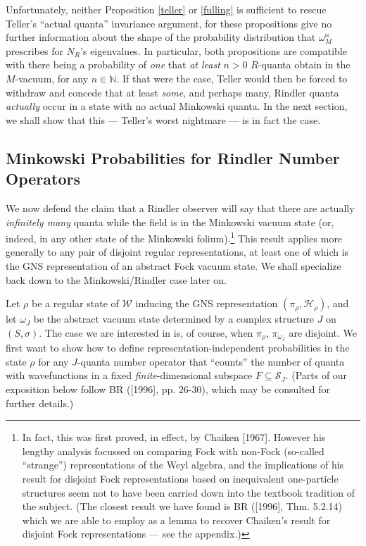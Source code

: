 \documentclass[12pt]{article}
\theoremstyle{remark}
\theoremstyle{definition}
\newcommand{\alg}[1]{\mathcal{#1}}
\newcommand{\hil}[1]{\mathcal{#1}}
\begin{document}
 Unfortunately, neither Proposition \ref{teller} or \ref{fulling} is sufficient to rescue 
 Teller's ``actual quanta'' invariance argument, for these propositions give 
 no further information about the shape of the probability distribution 
 that $\omega_{M}^{\bowtie}$ prescribes for $N_{R}$'s eigenvalues.  
 In particular, both propositions 
 are compatible with there being a probability of \emph{one} that 
 \emph{at least} $n>0$ 
 $R$-quanta obtain in the $M$-vacuum, for any $n\in\mathbb{N}$.  If that 
 were the case, Teller 
 would then be forced to withdraw and concede that at least \emph{some}, and 
 perhaps many, Rindler quanta \emph{actually} occur in a state with no 
 actual Minkowski quanta.  In the next section, we shall show that 
 this ---
 Teller's worst nightmare --- is in fact the case.  

\subsection{Minkowski Probabilities for Rindler Number Operators}

We now defend the claim that a Rindler observer will say that there
are actually \emph{infinitely many} quanta while the field is in the
Minkowski vacuum state (or, indeed, in any other state of the
Minkowski folium).\footnote{In fact, this was first proved, in effect,
  by Chaiken [1967].  However his lengthy analysis focussed on
  comparing Fock with non-Fock (so-called ``strange'') representations
  of the Weyl algebra, and the implications of his result for disjoint
  Fock representations based on inequivalent one-particle structures
  seem not to have been carried down into the textbook tradition of
  the subject.  (The closest result we have found is BR ([1996], Thm.
  5.2.14) which we are able to employ as a lemma to recover Chaiken's
  result for disjoint Fock representations --- see the appendix.)}
This result applies more generally to any pair of disjoint regular
representations, at least one of which is the GNS representation of an
abstract Fock vacuum state. We shall specialize back down to the
Minkowski/Rindler case later on.
  
Let $\rho$ be a regular state of $\alg{W}$ inducing the GNS 
representation $(\pi
_{\rho},\hil{H}_{\rho})$, and let $\omega_{J}$ be the abstract vacuum 
state determined by a complex structure $J$ on $(S,\sigma)$.  The 
case we are interested in is, of course, when $\pi
_{\rho}$, $\pi_{\omega_{J}}$ are disjoint.  We first want to show how to define representation-independent 
probabilities in the state $\rho$ for any $J$-quanta number operator 
that ``counts'' the number of quanta with wavefunctions in a fixed 
\emph{finite}-dimensional subspace 
$F\subseteq\hil{S}_{J}$.  (Parts of our exposition 
below follow BR ([1996], pp. 26-30), which may be consulted for further 
details.) 
\end{document}
